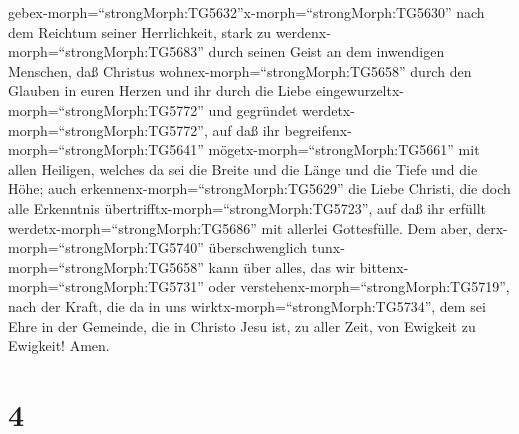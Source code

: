 gebex-morph=``strongMorph:TG5632''\textbar x-morph=``strongMorph:TG5630''
nach dem Reichtum seiner Herrlichkeit, stark zu
werdenx-morph=``strongMorph:TG5683'' durch seinen Geist an dem
inwendigen Menschen,  daß Christus
wohnex-morph=``strongMorph:TG5658'' durch den Glauben in euren Herzen
und ihr durch die Liebe eingewurzeltx-morph=``strongMorph:TG5772'' und
gegründet werdetx-morph=``strongMorph:TG5772'',  auf daß
ihr begreifenx-morph=``strongMorph:TG5641''
mögetx-morph=``strongMorph:TG5661'' mit allen Heiligen, welches da sei
die Breite und die Länge und die Tiefe und die Höhe;  auch
erkennenx-morph=``strongMorph:TG5629'' die Liebe Christi, die doch alle
Erkenntnis übertrifftx-morph=``strongMorph:TG5723'', auf daß ihr erfüllt
werdetx-morph=``strongMorph:TG5686'' mit allerlei Gottesfülle.
 Dem aber, derx-morph=``strongMorph:TG5740''
überschwenglich tunx-morph=``strongMorph:TG5658'' kann über alles, das
wir bittenx-morph=``strongMorph:TG5731'' oder
verstehenx-morph=``strongMorph:TG5719'', nach der Kraft, die da in uns
wirktx-morph=``strongMorph:TG5734'',  dem sei Ehre in der
Gemeinde, die in Christo Jesu ist, zu aller Zeit, von Ewigkeit zu
Ewigkeit! Amen.

\hypertarget{section-3}{%
\section{4}\label{section-3}}

